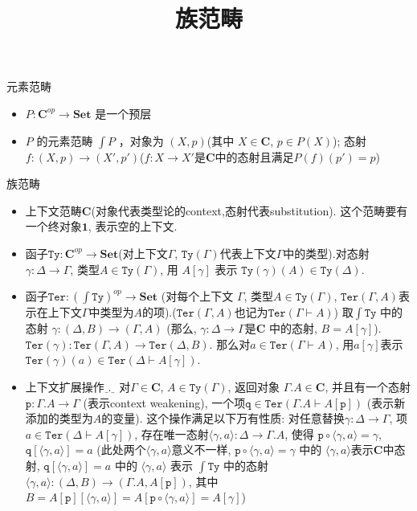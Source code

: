 \documentclass[aspectratio=169,xcolor=dvipsnames]{beamer}
\title{族范畴}
\date{}
\newcommand\Ty{\mathtt{Ty}}
\newcommand\Ter{\mathtt{Ter}}
\newcommand\ttp{\mathtt{p}}
\newcommand\ttq{\mathtt{q}}
\newcommand\bfone{\mathbf{1}}
\newcommand\Set{\mathbf{Set}}
\newcommand\C{\mathbf{C}}
\newcommand\extop{{\scalebox{0.4}[1]{\_}}.{\scalebox{0.4}[1]{\_}}}
\begin{document}
\begin{frame}
    \titlepage
\end{frame}

\begin{frame}{元素范畴}
  \begin{itemize}
    \item $P : \C^{op} \to \Set$ 是一个预层 \pause
    \item $P$ 的元素范畴 $\int P$ \pause，对象为 $(X,p)$\pause(其中 $X\in\C$, $p\in P(X)$); \pause 态射 $f : (X,p)\to(X',p')$\pause($f:X\to X'$是$\C$中的态射且满足$P(f)(p')=p$)
  \end{itemize}
\end{frame}

\begin{frame}[shrink]{族范畴}
\begin{itemize}
  \item 上下文范畴$\C$\pause(对象代表类型论的context,态射代表substitution). \pause 这个范畴要有一个终对象$\bfone$, 表示空的上下文.
  \item 函子$\Ty:\C^{op}\to\Set$\pause (对上下文$\Gamma$, $\Ty(\Gamma)$代表上下文$\Gamma$中的类型).\pause 对态射$\gamma:\Delta\to\Gamma$, 类型$A\in\Ty(\Gamma)$, 用 $A[\gamma]$ 表示 $\Ty(\gamma)(A)\in\Ty(\Delta)$.\pause
  \item 函子$\Ter:(\int\Ty)^{op}\to\Set$ (对每个上下文 $\Gamma$, 类型$A\in\Ty(\Gamma)$, $\Ter(\Gamma,A)$表示在上下文$\Gamma$中类型为$A$的项).\pause ($\Ter(\Gamma,A)$也记为$\Ter(\Gamma\vdash A)$) \pause 取$\int\Ty$ 中的态射 $\gamma:(\Delta,B)\to(\Gamma,A)$ \pause(那么, $\gamma:\Delta\to\Gamma$是$\C$ 中的态射, $B=A[\gamma]$). \pause $\Ter(\gamma):\Ter(\Gamma,A)\to\Ter(\Delta,B)$. 那么对$a\in\Ter(\Gamma\vdash A)$, 用$a[\gamma]$表示$\Ter(\gamma)(a)\in\Ter(\Delta\vdash A[\gamma])$.\pause
  \item 上下文扩展操作$\extop$ \pause 对$\Gamma\in\C$, $A\in\Ty(\Gamma)$, 返回对象 $\Gamma.A\in\C$, 并且有一个态射$\ttp:\Gamma.A\to\Gamma$ \pause (表示context weakening), \pause 一个项$\ttq\in\Ter(\Gamma.A\vdash A[\ttp])$ \pause (表示新添加的类型为$A$的变量). \pause 这个操作满足以下万有性质: 对任意替换$\gamma:\Delta\to\Gamma$, 项 $a\in\Ter(\Delta\vdash A[\gamma])$, 存在唯一态射$\langle\gamma,a\rangle:\Delta\to\Gamma.A$, 使得 $\ttp\circ\langle\gamma,a\rangle=\gamma$, $\ttq[\langle\gamma,a\rangle]=a$ \pause (此处两个$\langle\gamma,a\rangle$意义不一样, $\ttp\circ\langle\gamma,a\rangle=\gamma$ 中的 $\langle\gamma,a\rangle$表示$\C$中态射, $\ttq[\langle\gamma,a\rangle]=a$ 中的 $\langle\gamma,a\rangle$ 表示 $\int\Ty$ 中的态射 $\langle\gamma,a\rangle : (\Delta,B)\to (\Gamma.A,A[\ttp])$, 其中 $B=A[\ttp][\langle\gamma,a\rangle]=A[\ttp\circ\langle\gamma,a\rangle]=A[\gamma]$)
\end{itemize}
\end{frame}
\end{document}
